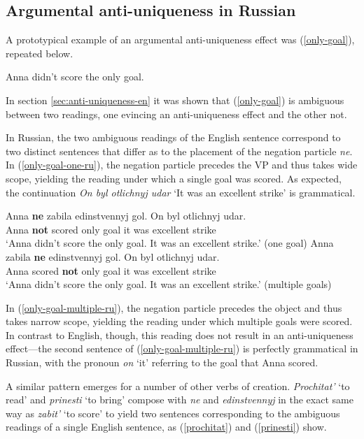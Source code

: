 \documentclass{article}
\begin{document}
\subsection{Argumental anti-uniqueness in Russian}
A prototypical example of an argumental anti-uniqueness effect was (\ref{only-goal}), repeated below.

\begin{exe}
	\ex Anna didn't score the only goal.
\end{exe}

In section \ref{sec:anti-uniqueness-en} it was shown that (\ref{only-goal}) is ambiguous between two readings, one evincing an anti-uniqueness effect and the other not.

In Russian, the two ambiguous readings of the English sentence correspond to two distinct sentences that differ as to the placement of the negation particle \textit{ne}. In (\ref{only-goal-one-ru}), the negation particle precedes the VP and thus takes wide scope, yielding the reading under which a single goal was scored. As expected, the continuation \textit{On byl otlichnyj udar} `It was an excellent strike' is grammatical.

\begin{exe}
	\ex \label{only-goal-one-ru} \gll Anna \textbf{ne} zabila edinstvennyj gol. On byl otlichnyj udar.\\
	Anna \textbf{not} scored only goal it was excellent strike\\
	\glt `Anna didn't score the only goal. It was an excellent strike.' (one goal)
	\ex \label{only-goal-multiple-ru} \gll Anna zabila \textbf{ne} edinstvennyj gol. On byl otlichnyj udar.\\
	Anna scored \textbf{not} only goal it was excellent strike\\
	\glt `Anna didn't score the only goal. It was an excellent strike.' (multiple goals)
\end{exe}

In (\ref{only-goal-multiple-ru}), the negation particle precedes the object and thus takes narrow scope, yielding the reading under which multiple goals were scored. In contrast to English, though, this reading does not result in an anti-uniqueness effect---the second sentence of (\ref{only-goal-multiple-ru}) is perfectly grammatical in Russian, with the pronoun \textit{on} `it' referring to the goal that Anna scored.


A similar pattern emerges for a number of other verbs of creation. \textit{Prochitat'} `to read' and \textit{prinesti} `to bring' compose with \textit{ne} and \textit{edinstvennyj} in the exact same way as \textit{zabit'} `to score' to yield two sentences corresponding to the ambiguous readings of a single English sentence, as (\ref{prochitat}) and (\ref{prinesti}) show.
\end{document}
